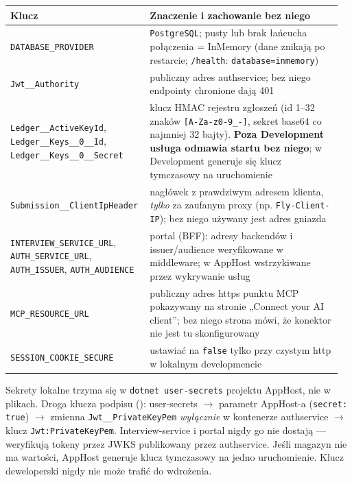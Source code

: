 {\begin{center}
\small
\begin{longtable}{@{}>{\raggedright\arraybackslash}p{0.38\linewidth}>{\raggedright\arraybackslash}p{0.58\linewidth}@{}}
\toprule
Klucz & Znaczenie i zachowanie bez niego \\
\midrule
\endhead
\texttt{DATABASE\_\allowbreak{}PROVIDER} & \texttt{PostgreSQL}; pusty lub brak łańcucha połączenia = InMemory (dane znikają po restarcie; \texttt{/health}: \texttt{database=inmemory}) \\
\texttt{Jwt\_\allowbreak{}\_\allowbreak{}Authority} & publiczny adres authservice; bez niego endpointy chronione dają 401 \\
\texttt{Ledger\_\allowbreak{}\_\allowbreak{}ActiveKeyId}, \texttt{Ledger\_\allowbreak{}\_\allowbreak{}Keys\_\allowbreak{}\_\allowbreak{}0\_\allowbreak{}\_\allowbreak{}Id}, \texttt{Ledger\_\allowbreak{}\_\allowbreak{}Keys\_\allowbreak{}\_\allowbreak{}0\_\allowbreak{}\_\allowbreak{}Secret} & klucz HMAC rejestru zgłoszeń (id 1--32 znaków \texttt{[A-Za-z0-9\_-]}, sekret base64 co najmniej 32 bajty). \textbf{Poza Development usługa odmawia startu bez niego}; w Development generuje się klucz tymczasowy na uruchomienie \\
\texttt{Submission\_\allowbreak{}\_\allowbreak{}ClientIpHeader} & nagłówek z prawdziwym adresem klienta, \emph{tylko} za zaufanym proxy (np. \texttt{Fly-Client-IP}); bez niego używany jest adres gniazda \\
\texttt{INTERVIEW\_\allowbreak{}SERVICE\_\allowbreak{}URL}, \texttt{AUTH\_\allowbreak{}SERVICE\_\allowbreak{}URL}, \texttt{AUTH\_ISSUER}, \texttt{AUTH\_AUDIENCE} & portal (BFF): adresy backendów i issuer/audience weryfikowane w middleware; w AppHost wstrzykiwane przez wykrywanie usług \\
\texttt{MCP\_\allowbreak{}RESOURCE\_\allowbreak{}URL} & publiczny adres https punktu MCP pokazywany na stronie „Connect your AI client”; bez niego strona mówi, że konektor nie jest tu skonfigurowany \\
\texttt{SESSION\_\allowbreak{}COOKIE\_\allowbreak{}SECURE} & ustawiać na \texttt{false} tylko przy czystym http w lokalnym developmencie \\
\bottomrule
\end{longtable}
\end{center}

Sekrety lokalne trzyma się w \texttt{dotnet user-\allowbreak{}secrets} projektu AppHost, nie
w plikach. Droga klucza podpisu ():
user-secrets $\rightarrow$ parametr AppHost-a (\texttt{secret: true}) $\rightarrow$
zmienna \texttt{Jwt\_\allowbreak{}\_\allowbreak{}PrivateKeyPem} \emph{wyłącznie} w kontenerze
authservice $\rightarrow$ klucz \texttt{Jwt:\allowbreak{}PrivateKeyPem}. Interview-service i
portal nigdy go nie dostają --- weryfikują tokeny przez JWKS publikowany przez
authservice. Jeśli magazyn nie ma wartości, AppHost generuje klucz tymczasowy
na jedno uruchomienie. Klucz deweloperski nigdy nie może trafić do wdrożenia.

}
